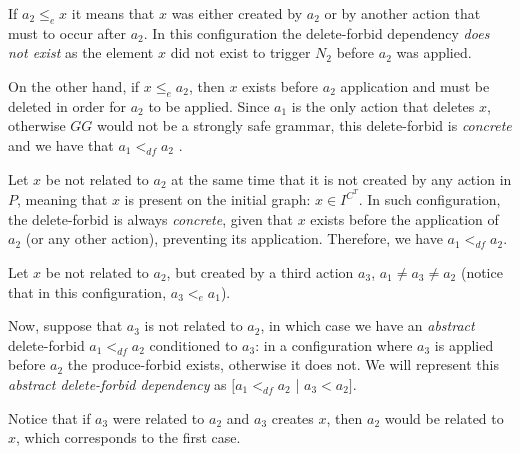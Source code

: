   \begin{description}[style=nextline]
  \item [Related element:] If $a_2 \leq_e x$ it means that $x$ was either created by $a_2$ or by another action that must to occur after $a_2$. In this configuration the delete-forbid dependency \emph{does not exist} as the element $x$ did not exist to trigger $N_2$ before $a_2$ was applied. 

On the other hand, if $x \leq_e a_2$, then $x$ exists before $a_2$ application and must be deleted in order for $a_2$ to be applied. Since $a_1$ is the only action that deletes $x$, otherwise $GG$ would not be a strongly safe grammar, this delete-forbid is \emph{concrete} and we have that $a_1 <_{df} a_2$ .

\item [Unrelated element present on the initial graph:]
Let $x$ be not related to $a_2$ at the same time that it is not created by any action in $P$, meaning that $x$ is present on the initial graph: $x \in I^{C^T}$. In such configuration, the delete-forbid is always \emph{concrete}, given that $x$ exists before the application of $a_2$ (or any other action), preventing its application. Therefore, we have $a_1 <_{df} a_2$.

\item [Unrelated element absent from the initial graph:]
Let $x$ be not related to $a_2$, but created by a third action $a_3$, $a_1 \ne a_3 \ne a_2$ (notice that in this configuration, $a_3 <_{e} a_1$). 

Now, suppose that $a_3$ is not related to $a_2$, in which case we have an \emph{abstract} delete-forbid $a_1 <_{df} a_2$ conditioned to $a_3$: in a configuration where $a_3$ is applied before $a_2$ the produce-forbid exists, otherwise it does not. We will represent this \emph{abstract delete-forbid dependency} as $[a_1 <_{df} a_2$ | $a_3 < a_2 ]$.
  
Notice that if $a_3$ were related to $a_2$ and $a_3$ creates $x$, then $a_2$ would be related to $x$, which corresponds to the first case.
\end{description}

